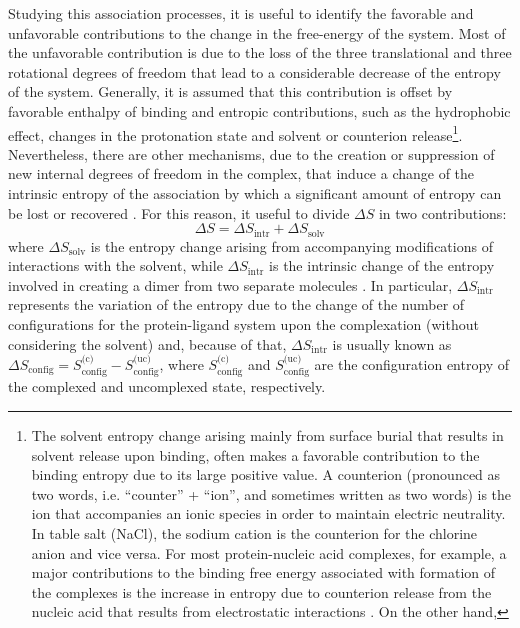 Studying this association processes, it is useful to identify the favorable and unfavorable contributions to the change in the free-energy of the system. Most of the unfavorable contribution is due to the loss of the three translational and three rotational degrees of freedom that lead to a considerable decrease of the entropy of the system. Generally, it is assumed that this contribution is offset by favorable enthalpy of binding and entropic contributions, such as the hydrophobic effect, changes in the protonation state and solvent or counterion release\footnote{The solvent entropy change arising mainly from surface burial that results in solvent release upon binding, often makes a favorable contribution to the binding entropy due to its large positive value. A counterion (pronounced as two words, i.e. ``counter'' + ``ion'', and sometimes written as two words) is the ion that accompanies an ionic species in order to maintain electric neutrality. In table salt (NaCl), the sodium cation is the counterion for the chlorine anion and vice versa. For most protein-nucleic acid complexes, for example, a major contributions to the binding free energy associated with formation of the complexes is the increase in entropy due to counterion release from the nucleic acid that results from electrostatic interactions \cite{mascotti1990thermodynamic}. On the other hand,}. Nevertheless, there are other mechanisms, due to the creation or suppression of new internal degrees of freedom in the complex, that induce a change of the intrinsic entropy of the association by which a significant amount of entropy can be lost or recovered \cite{tidor1994contribution}. For this reason, it useful to divide $\Delta S$ in two contributions:
\begin{equation*}
\label{entropy-variation:total}
\Delta S = \Delta S_\text{intr} + \Delta S_\text{solv}
\end{equation*}
where $\Delta S_\text{solv}$ is the entropy change arising from accompanying modifications of interactions with the solvent, while $\Delta S_\text{intr}$ is the intrinsic change of the entropy involved in creating a dimer from two separate molecules \cite{steinberg1963entropy}. In particular, $\Delta S_\text{intr}$ represents the variation of the entropy due to the change of the number of configurations for the protein-ligand system upon the complexation (without considering the solvent) and, because of that, $\Delta S_\text{intr}$ is usually known as $\Delta S_\text{config} = S_\text{config}^\text{(c)} - S_\text{config}^\text{(uc)}$, where $S_\text{config}^\text{(c)}$ and $S_\text{config}^\text{(uc)}$ are the configuration entropy of the complexed and uncomplexed state, respectively. 

